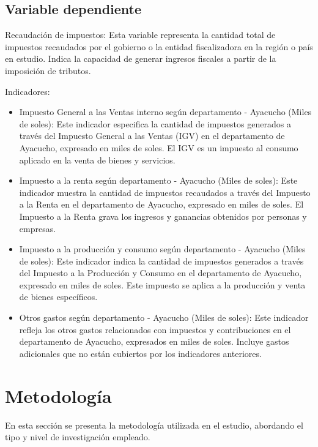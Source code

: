 \documentclass[
  letterpaper,
  DIV=11,
  numbers=noendperiod]{scrartcl}
\begin{document}
\hypertarget{sec-variable-dependiente}{%
\subsection{Variable dependiente}\label{sec-variable-dependiente}}

Recaudación de impuestos: Esta variable representa la cantidad total de
impuestos recaudados por el gobierno o la entidad fiscalizadora en la
región o país en estudio. Indica la capacidad de generar ingresos
fiscales a partir de la imposición de tributos.

Indicadores:

\begin{itemize}
\item
  Impuesto General a las Ventas interno según departamento - Ayacucho
  (Miles de soles): Este indicador especifica la cantidad de impuestos
  generados a través del Impuesto General a las Ventas (IGV) en el
  departamento de Ayacucho, expresado en miles de soles. El IGV es un
  impuesto al consumo aplicado en la venta de bienes y servicios.
\item
  Impuesto a la renta según departamento - Ayacucho (Miles de soles):
  Este indicador muestra la cantidad de impuestos recaudados a través
  del Impuesto a la Renta en el departamento de Ayacucho, expresado en
  miles de soles. El Impuesto a la Renta grava los ingresos y ganancias
  obtenidos por personas y empresas.
\item
  Impuesto a la producción y consumo según departamento - Ayacucho
  (Miles de soles): Este indicador indica la cantidad de impuestos
  generados a través del Impuesto a la Producción y Consumo en el
  departamento de Ayacucho, expresado en miles de soles. Este impuesto
  se aplica a la producción y venta de bienes específicos.
\item
  Otros gastos según departamento - Ayacucho (Miles de soles): Este
  indicador refleja los otros gastos relacionados con impuestos y
  contribuciones en el departamento de Ayacucho, expresados en miles de
  soles. Incluye gastos adicionales que no están cubiertos por los
  indicadores anteriores.
\end{itemize}

\hypertarget{sec-metodologuxeda}{%
\section{Metodología}\label{sec-metodologuxeda}}

En esta sección se presenta la metodología utilizada en el estudio,
abordando el tipo y nivel de investigación empleado.
\end{document}
